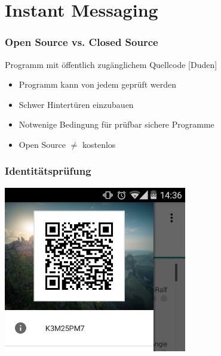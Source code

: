 \section{Instant Messaging}


\begin{frame}
  \frametitle{Open Source vs. Closed Source}
  \begin{definition}
   Programm mit öffentlich zugänglichem Quellcode \hfill \tiny [Duden]
  \end{definition}

  \begin{itemize}
   \item Programm kann von jedem geprüft werden
   \item Schwer Hintertüren einzubauen
   \item Notwenige Bedingung für prüfbar sichere Programme
   \item Open Source $\neq$ kostenlos
  \end{itemize}
\end{frame}

\begin{frame}
  \frametitle{Identitätsprüfung}
  \center
  \includegraphics[width=0.6\textwidth]{figures/Threema_ID.png}
\end{frame}

